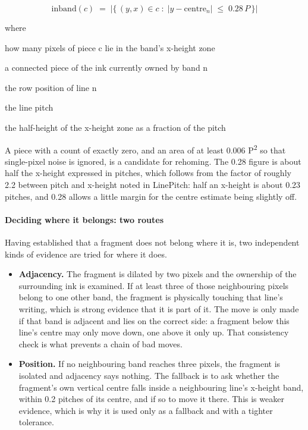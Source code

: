 \begin{equation}
\mathrm{inband}(c) \;=\; \big|\{\,(y,x) \in c \;:\; |y - \mathrm{centre}_{n}| \;\le\; 0.28\,P \,\}\big|
\end{equation}

\noindent where
\begin{description}[leftmargin=2.4em,style=nextline,font=\normalfont\ttfamily]\setlength\itemsep{1pt}
  \item[{$\mathrm{inband}(c)$}] \normalfont how many pixels of piece c lie in the band's x-height zone
  \item[{$c$}] \normalfont a connected piece of the ink currently owned by band n
  \item[{$\mathrm{centre}_{n}$}] \normalfont the row position of line n
  \item[{$P$}] \normalfont the line pitch
  \item[{$0.28$}] \normalfont the half-height of the x-height zone as a fraction of the pitch
\end{description}
A piece with a count of exactly zero, and an area of at least 0.006 P\textsuperscript{2} so that single-pixel noise is ignored, is a candidate for rehoming. The 0.28 figure is about half the x-height expressed in pitches, which follows from the factor of roughly 2.2 between pitch and x-height noted in LinePitch: half an x-height is about 0.23 pitches, and 0.28 allows a little margin for the centre estimate being slightly off.


\paragraph{Deciding where it belongs: two routes}
Having established that a fragment does not belong where it is, two independent kinds of evidence are tried for where it does.


\begin{itemize}\setlength\itemsep{0pt}
  \item \textbf{Adjacency.} The fragment is dilated by two pixels and the ownership of the surrounding ink is examined. If at least three of those neighbouring pixels belong to one other band, the fragment is physically touching that line's writing, which is strong evidence that it is part of it. The move is only made if that band is adjacent and lies on the correct side: a fragment below this line's centre may only move down, one above it only up. That consistency check is what prevents a chain of bad moves.
  \item \textbf{Position.} If no neighbouring band reaches three pixels, the fragment is isolated and adjacency says nothing. The fallback is to ask whether the fragment's own vertical centre falls inside a neighbouring line's x-height band, within 0.2 pitches of its centre, and if so to move it there. This is weaker evidence, which is why it is used only as a fallback and with a tighter tolerance.
\end{itemize}

